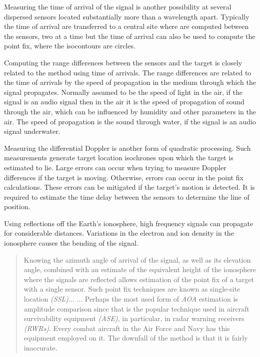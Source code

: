 \documentclass[english,purist]{ist-report}
\begin{document}
Measuring the time of arrival of the signal is another possibility at
several dispersed sensors located substantially more than a wavelength apart. Typically the time of arrival are transferred to a central site where are computed between the sensors, two at a time but the time of arrival can also be used to compute the point fix, where the isocontours are circles.

Computing the range differences between the sensors and the target is closely related to the method using time of arrivals. The range differences are related to the time of arrivals by the speed of propagation in the medium through which the signal propagates.
Normally assumed to be the speed of light in the air, if the signal is an audio signal then in the air it is the speed of propagation of sound through the air, which can be influenced by humidity and other parameters in the air. The speed of propagation is the sound through water, if the signal is an audio signal underwater.

Measuring the differential Doppler is another form of quadratic processing. Such measurements generate target location isochrones upon which the target is estimated to lie.  Large errors can occur when trying to measure Doppler differences if the target is moving.
Otherwise, errors can occur in the point fix calculations. These errors can be mitigated if the target's motion is detected. It is required to estimate the time delay between the sensors to determine the line of position. 

Using reflections off the Earth’s ionosphere, high frequency signals can propagate for considerable distances. Variations in the electron and ion density in the ionosphere causes the bending of the signal.

\begin{quote} \itshape
    
Knowing the azimuth angle of arrival of the signal, as well as its elevation angle, combined with an estimate of the equivalent height of the ionosphere where the signals are reflected allows estimation of the point fix of a target with a single sensor. Such point fix techniques are known as single-site location \textit{(SSL)}...
... Perhaps the most used form of \textit{AOA} estimation is amplitude comparison since that is the popular technique used in aircraft survivability equipment \textit{(ASE)}, in particular, in radar warning receivers \textit{(RWRs)}. Every combat aircraft in the Air
Force and Navy has this equipment employed on it. The downfall of the method is that it is fairly inaccurate. \cite{poiseltarget}
\end{quote}
 
\end{document}
